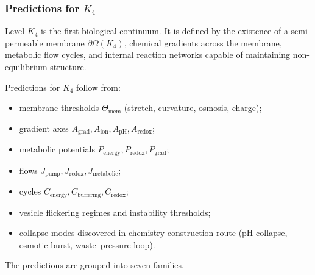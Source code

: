 

\subsubsection{Predictions for \texorpdfstring{$K_4$}{K_4}}
\label{sec:predictions-k4}

Level $K_4$ is the first biological continuum.
It is defined by the existence of a semi-permeable membrane $\partial\Omega(K_4)$,
chemical gradients across the membrane, metabolic flow cycles, and internal
reaction networks capable of maintaining non-equilibrium structure.

Predictions for $K_4$ follow from:
\begin{itemize}
    \item membrane thresholds $\Theta_{\mathrm{mem}}$ (stretch, curvature, osmosis, charge);
    \item gradient axes $A_{\mathrm{grad}},A_{\mathrm{ion}},A_{\mathrm{pH}},A_{\mathrm{redox}}$;
    \item metabolic potentials $P_{\mathrm{energy}},P_{\mathrm{redox}},P_{\mathrm{grad}}$;
    \item flows $J_{\mathrm{pump}},J_{\mathrm{redox}},J_{\mathrm{metabolic}}$;
    \item cycles $C_{\mathrm{energy}},C_{\mathrm{buffering}},C_{\mathrm{redox}}$;
    \item vesicle flickering regimes and instability thresholds;
    \item collapse modes discovered in chemistry construction route (pH-collapse, osmotic burst, waste–pressure loop).
\end{itemize}

The predictions are grouped into seven families.

